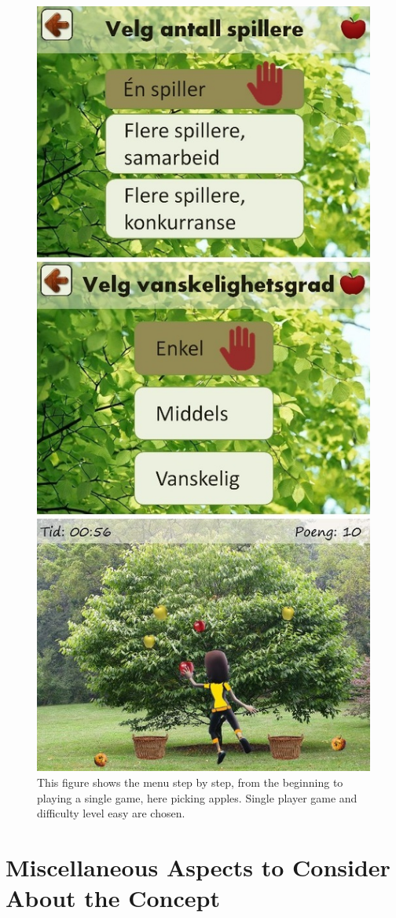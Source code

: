 \begin{figure} [ht!]
\centering
\includegraphics[scale=0.5]{menuStep2.jpg}
\caption[The menu, part two]{This figure shows the menu step by step, from the beginning to playing a single game, here picking apples. Single player game and difficulty level easy are chosen.}
\label{menu2}
\end{figure}

\section{Miscellaneous Aspects to Consider About the Concept}